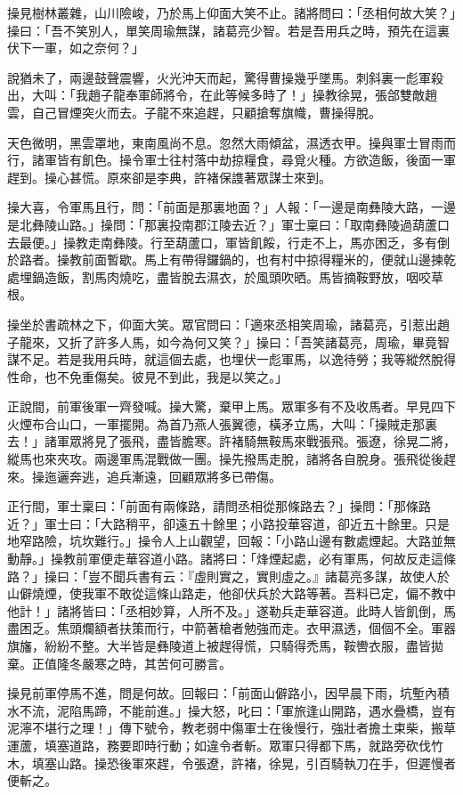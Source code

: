 操見樹林叢雜，山川險峻，乃於馬上仰面大笑不止。諸將問曰：「丞相何故大笑？」操曰：「吾不笑別人，單笑周瑜無謀，諸葛亮少智。若是吾用兵之時，預先在這裏伏下一軍，如之奈何？」

說猶未了，兩邊鼓聲震響，火光沖天而起，驚得曹操幾乎墜馬。刺斜裏一彪軍殺出，大叫：「我趙子龍奉軍師將令，在此等候多時了！」操教徐晃，張郃雙敵趙雲，自己冒煙突火而去。子龍不來追趕，只顧搶奪旗幟，曹操得脫。

天色微明，黑雲罩地，東南風尚不息。忽然大雨傾盆，濕透衣甲。操與軍士冒雨而行，諸軍皆有飢色。操令軍士往村落中劫掠糧食，尋覓火種。方欲造飯，後面一軍趕到。操心甚慌。原來卻是李典，許褚保謢著眾謀士來到。

操大喜，令軍馬且行，問：「前面是那裏地面？」人報：「一邊是南彝陵大路，一邊是北彝陵山路。」操問：「那裏投南郡江陵去近？」軍士稟曰：「取南彝陵過葫蘆口去最便。」操教走南彝陵。行至葫蘆口，軍皆飢餒，行走不上，馬亦困乏，多有倒於路者。操教前面暫歇。馬上有帶得鑼鍋的，也有村中掠得糧米的，便就山邊揀乾處埋鍋造飯，割馬肉燒吃，盡皆脫去濕衣，於風頭吹晒。馬皆摘鞍野放，咽咬草根。

操坐於書疏林之下，仰面大笑。眾官問曰：「適來丞相笑周瑜，諸葛亮，引惹出趙子龍來，又折了許多人馬，如今為何又笑？」操曰：「吾笑諸葛亮，周瑜，畢竟智謀不足。若是我用兵時，就這個去處，也埋伏一彪軍馬，以逸待勞；我等縱然脫得性命，也不免重傷矣。彼見不到此，我是以笑之。」

正說間，前軍後軍一齊發喊。操大驚，棄甲上馬。眾軍多有不及收馬者。早見四下火煙布合山口，一軍擺開。為首乃燕人張翼德，橫矛立馬，大叫：「操賊走那裏去！」諸軍眾將見了張飛，盡皆膽寒。許褚騎無鞍馬來戰張飛。張遼，徐晃二將，縱馬也來夾攻。兩邊軍馬混戰做一團。操先撥馬走脫，諸將各自脫身。張飛從後趕來。操迤邐奔逃，追兵漸遠，回顧眾將多已帶傷。

正行間，軍士稟曰：「前面有兩條路，請問丞相從那條路去？」操問：「那條路近？」軍士曰：「大路稍平，卻遠五十餘里；小路投華容道，卻近五十餘里。只是地窄路險，坑坎難行。」操令人上山觀望，回報：「小路山邊有數處煙起。大路並無動靜。」操教前軍便走華容道小路。諸將曰：「烽煙起處，必有軍馬，何故反走這條路？」操曰：「豈不聞兵書有云：『虛則實之，實則虛之。』諸葛亮多謀，故使人於山僻燒煙，使我軍不敢從這條山路走，他卻伏兵於大路等著。吾料已定，偏不教中他計！」諸將皆曰：「丞相妙算，人所不及。」遂勒兵走華容道。此時人皆飢倒，馬盡困乏。焦頭爛額者扶策而行，中箭著槍者勉強而走。衣甲濕透，個個不全。軍器旗旛，紛紛不整。大半皆是彝陵道上被趕得慌，只騎得禿馬，鞍轡衣服，盡皆拋棄。正值隆冬嚴寒之時，其苦何可勝言。

操見前軍停馬不進，問是何故。回報曰：「前面山僻路小，因早晨下雨，坑塹內積水不流，泥陷馬蹄，不能前進。」操大怒，叱曰：「軍旅逢山開路，遇水疊橋，豈有泥濘不堪行之理！」傳下號令，教老弱中傷軍士在後慢行，強壯者擔土束柴，搬草運蘆，填塞道路，務要即時行動；如違令者斬。眾軍只得都下馬，就路旁砍伐竹木，填塞山路。操恐後軍來趕，令張遼，許褚，徐晃，引百騎執刀在手，但遲慢者便斬之。

